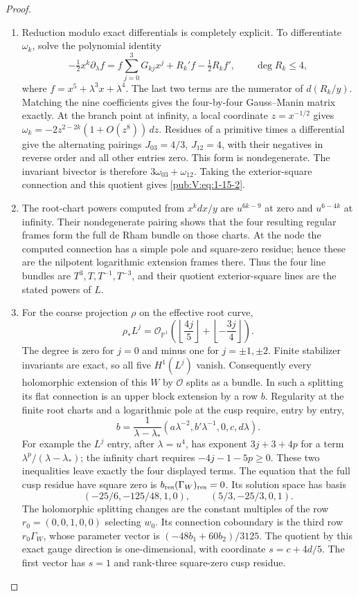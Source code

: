 \documentclass[11pt,a4paper]{article}
\numberwithin{equation}{section}
\theoremstyle{definition}
\begin{document}
\begin{proof}
\begin{enumerate}[label=\arabic*.]
\item Reduction modulo exact differentials is completely explicit.  To
differentiate $\omega_k$, solve the polynomial identity
\[
-\tfrac12x^k\partial_\lambda f
 =f\sum_{j=0}^3G_{kj}x^j+R_k'f-\tfrac12R_kf',
 \qquad\deg R_k\leq4,
\]
where $f=x^5+\lambda^3x+\lambda^4$.  The last two terms are the
numerator of $d(R_k/y)$.  Matching the nine coefficients gives the
four-by-four Gauss--Manin matrix exactly.
At the branch point at infinity, a local coordinate $z=x^{-1/2}$
gives $\omega_k=-2z^{2-2k}(1+O(z^8))\,dz$.
Residues of a primitive times a differential give the alternating
pairings $J_{03}=4/3$, $J_{12}=4$, with their negatives in reverse
order and all other entries zero.  This form is nondegenerate.
The invariant bivector is therefore $3\omega_{03}+\omega_{12}$.
Taking the exterior-square connection and this quotient gives
\eqref{pub:V:eq:1-15-2}.

\item The root-chart powers computed from $x^kdx/y$ are
$u^{6k-9}$ at zero and $u^{6-4k}$ at infinity.
Their nondegenerate pairing shows that the four resulting regular
frames form the full de Rham bundle on those charts.  At the node
the computed connection has a simple pole and square-zero residue;
hence these are the nilpotent logarithmic extension frames there.
Thus the four line bundles are
$T^3,T,T^{-1},T^{-3}$, and their quotient exterior-square lines are
the stated powers of $L$.

\item For the coarse projection $\rho$ on the effective root curve,
\[
 \rho_*L^j=\mathcal O_{\mathbb P^1}
 \left(\left\lfloor\frac{4j}{5}\right\rfloor+
       \left\lfloor-\frac{3j}{4}\right\rfloor\right).
\]
The degree is zero for $j=0$ and minus one for $j=\pm1,\pm2$.
Finite stabilizer invariants are exact, so all five $H^1(L^j)$ vanish.  Consequently every holomorphic
extension of this $W$ by $\mathcal O$ splits as a bundle.
In such a splitting its flat connection is an upper block extension
by a row $b$.  Regularity at the finite root charts and a logarithmic
pole at the cusp require, entry by entry,
\[
b=\frac1{\lambda-\lambda_*}
 (a\lambda^{-2},b'\lambda^{-1},0,c,d\lambda).
\]
For example the $L^j$ entry, after $\lambda=u^4$, has exponent
$3j+3+4p$ for a term $\lambda^p/ (\lambda-\lambda_*)$;
the infinity chart requires $-4j-1-5p\geq0$.
These two inequalities leave exactly the four displayed terms.
The equation that the full cusp residue have square zero is
$b_{\rm res}(\Gamma_W)_{\rm res}=0$.
Its solution space has basis
\[
(-25/6,-125/48,1,0),\qquad(5/3,-25/3,0,1).
\]
The holomorphic splitting changes are the constant multiples of the
row $r_0=(0,0,1,0,0)$ selecting $w_0$.  Its connection coboundary
is the third row $r_0\Gamma_W$, whose parameter vector is
$(-48b_1+60b_2)/3125$.  The quotient by this exact gauge direction
is one-dimensional, with coordinate $s=c+4d/5$.  The first
vector has $s=1$ and rank-three square-zero cusp residue.


\end{enumerate}
\end{proof}
\end{document}
